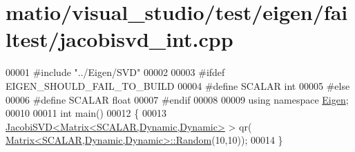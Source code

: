 \hypertarget{matio_2visual__studio_2test_2eigen_2failtest_2jacobisvd__int_8cpp_source}{}\section{matio/visual\+\_\+studio/test/eigen/failtest/jacobisvd\+\_\+int.cpp}
\label{matio_2visual__studio_2test_2eigen_2failtest_2jacobisvd__int_8cpp_source}

\begin{DoxyCode}
00001 \textcolor{preprocessor}{#include "../Eigen/SVD"}
00002 
00003 \textcolor{preprocessor}{#ifdef EIGEN\_SHOULD\_FAIL\_TO\_BUILD}
00004 \textcolor{preprocessor}{#define SCALAR int}
00005 \textcolor{preprocessor}{#else}
00006 \textcolor{preprocessor}{#define SCALAR float}
00007 \textcolor{preprocessor}{#endif}
00008 
00009 \textcolor{keyword}{using namespace }\hyperlink{namespace_eigen}{Eigen};
00010 
00011 \textcolor{keywordtype}{int} main()
00012 \{
00013   \hyperlink{group___s_v_d___module_class_eigen_1_1_jacobi_s_v_d}{JacobiSVD<Matrix<SCALAR,Dynamic,Dynamic>} > qr(
      \hyperlink{group___core___module_class_eigen_1_1_matrix}{Matrix<SCALAR,Dynamic,Dynamic>::Random}(10,10));
00014 \}
\end{DoxyCode}
